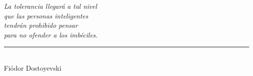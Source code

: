 \chapter*{} %
\thispagestyle{empty} %

\begin{flushright}
    \textit{La tolerancia llegará a tal nivel \\ que las personas inteligentes \\ tendrán prohibido pensar \\ para no ofender a los imbéciles. 
    } \\
    \rule{5cm}{0.5pt} 
    \\ Fiódor Dostoyevski
\end{flushright}

